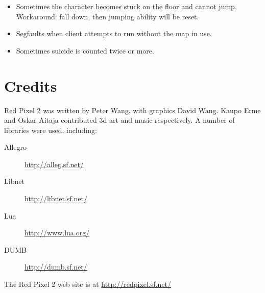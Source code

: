 \documentclass[a4paper]{article}
\begin{document}
\begin{itemize}

\item Sometimes the character becomes stuck on the floor and cannot
  jump.  Workaround: fall down, then jumping ability will be reset.

\item Segfaults when client attempts to run without the map in use.

\item Sometimes suicide is counted twice or more.

\end{itemize}



\section{Credits}

Red Pixel 2 was written by Peter Wang, with graphics David Wang.
Kaupo Erme and Oskar Aitaja contributed 3d art and music respectively.
A number of libraries were used, including:

\begin{description}
\item [Allegro] \url{http://alleg.sf.net/}
\item [Libnet] \url{http://libnet.sf.net/}
\item [Lua] \url{http://www.lua.org/}
\item [DUMB] \url{http://dumb.sf.net/}
\end{description}

\noindent
The Red Pixel 2 web site is at \url{http://redpixel.sf.net/}
\end{document}
